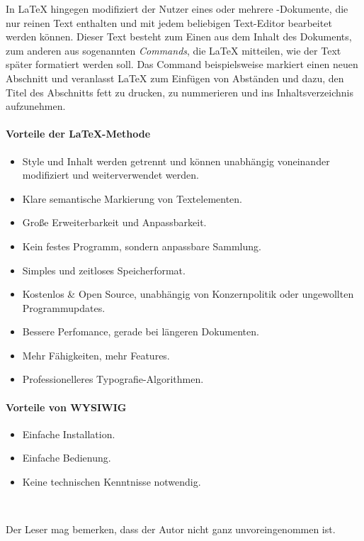 In \LaTeX{} hingegen modifiziert der Nutzer eines oder mehrere -Dokumente, die nur reinen Text enthalten und mit jedem beliebigen Text-Editor bearbeitet werden können.
Dieser Text besteht zum Einen aus dem Inhalt des Dokuments, zum anderen aus sogenannten \emph{Commands}, die \LaTeX{} mitteilen, wie der Text später formatiert werden soll. Das Command  beispielsweise markiert einen neuen Abschnitt und veranlasst \LaTeX{} zum Einfügen von Abständen und dazu, den Titel des Abschnitts fett zu drucken, zu nummerieren und ins Inhaltsverzeichnis aufzunehmen.


\paragraph{Vorteile der \LaTeX{}-Methode}
\begin{itemize}
	\item Style und Inhalt werden getrennt und können unabhängig voneinander modifiziert und weiterverwendet werden.
	\item Klare semantische Markierung von Textelementen.
	\item Große Erweiterbarkeit und Anpassbarkeit.
	\item Kein festes Programm, sondern anpassbare Sammlung.
	\item Simples und zeitloses Speicherformat.
	\item Kostenlos \& Open Source, unabhängig von Konzernpolitik oder ungewollten Programmupdates.
	\item Bessere Perfomance, gerade bei längeren Dokumenten.
	\item Mehr Fähigkeiten, mehr Features.
	\item Professionelleres Typografie-Algorithmen.
\end{itemize}

\paragraph{Vorteile von WYSIWIG}
\begin{itemize}
	\item Einfache Installation.
	\item Einfache Bedienung.
	\item Keine technischen Kenntnisse notwendig.
\end{itemize}

~

Der Leser mag bemerken, dass der Autor nicht ganz unvoreingenommen ist.

